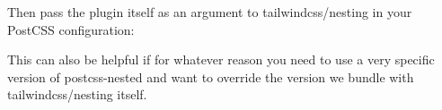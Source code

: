 \begin{DoxyCode}{0}

\end{DoxyCode}


Then pass the plugin itself as an argument to {\ttfamily tailwindcss/nesting} in your Post\+CSS configuration\+:


\begin{DoxyCode}{0}
\DoxyCodeLine{\ \ plugins:\ [}
\DoxyCodeLine{\ \ ]}
\DoxyCodeLine{\}}

\end{DoxyCode}


This can also be helpful if for whatever reason you need to use a very specific version of {\ttfamily postcss-\/nested} and want to override the version we bundle with {\ttfamily tailwindcss/nesting} itself. 